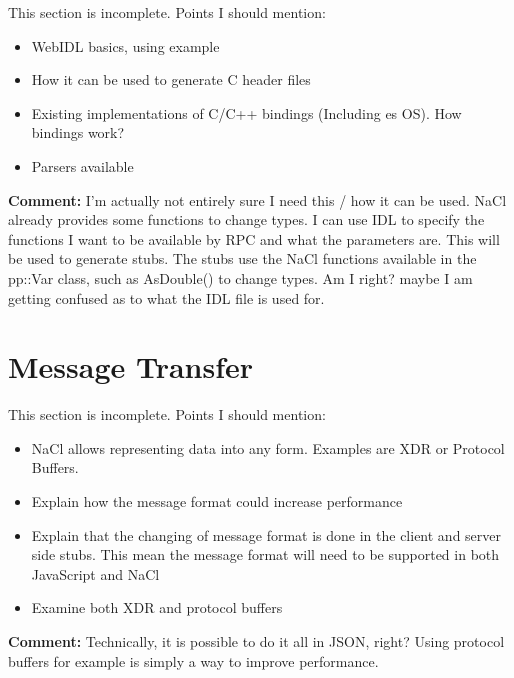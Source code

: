This section is incomplete. Points I should mention:
\begin{itemize}
	\item WebIDL basics, using example
	\item How it can be used to generate C header files
	\item Existing implementations of C/C++ bindings (Including es OS). How bindings work?
	\item Parsers available
\end{itemize}

\textbf{Comment: } I'm actually not entirely sure I need this / how it can be used. NaCl already provides some functions to change types. I can use IDL to specify the functions I want to be available by RPC and what the parameters are. This will be used to generate stubs. The stubs use the NaCl functions available in the pp::Var class, such as AsDouble() to change types. Am I right? maybe I am getting confused as to what the IDL file is used for.

\section{Message Transfer}
This section is incomplete. Points I should mention:

\begin{itemize}
	\item NaCl allows representing data into any form. Examples are XDR or Protocol Buffers.
	\item Explain how the message format could increase performance
	\item Explain that the changing of message format is done in the client and server side stubs. This mean the message format will need to be supported in both JavaScript and NaCl
	\item Examine both XDR and protocol buffers
\end{itemize}

\textbf{Comment: } Technically, it is possible to do it all in JSON, right? Using protocol buffers for example is simply a way to improve performance.

